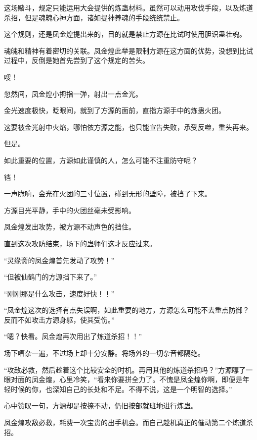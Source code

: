 
\begin{this_body}



这场赌斗，规定只能运用大会提供的炼蛊材料。虽然可以动用攻伐手段，以及炼道杀招，但是魂魄心神方面，诸如提神养魂的手段统统禁止。

这个规则，还是凤金煌提出来的，目的就是禁止方源在比试时使用胆识蛊壮魂。

魂魄和精神有着密切的关联。凤金煌此举是限制方源在这方面的优势，没想到比试过程中，反倒是她首先尝到了这个规定的苦头。

嗖！

忽然间，凤金煌小拇指一弹，射出一点金光。

金光速度极快，眨眼间，就到了方源的面前，直指方源手中的炼蛊火团。

这要被金光射中火焰，哪怕依方源之能，也只能宣告失败，承受反噬，重头再来。

但是。

如此重要的位置，方源如此谨慎的人，怎么可能不注重防守呢？

铛！

一声脆响，金光在火团的三寸位置，碰到无形的壁障，被挡了下来。

方源目光平静，手中的火团丝毫未受影响。

凤金煌发出攻势，被方源不动声色的挡住。

直到这次攻防结束，场下的蛊师们这才反应过来。

“灵缘斋的凤金煌首先发动了攻势！”

“但被仙鹤门的方源挡下来了。”

“刚刚那是什么攻击，速度好快！！”

“凤金煌这次的选择有点失误啊，如此重要的地方，方源怎么可能不去重点防御？反而不如攻击方源身躯，使其受伤。”

“嗯？快看。凤金煌再次用出了炼道杀招！！”

场下嘈杂一遍，不过场上却十分安静。将场外的一切杂音都隔绝。

“攻敌必救，然后趁着这个比较安全的时机。再用其他的炼道杀招吗？”方源瞟了一眼对面的凤金煌，心里冷笑，“看来你要拼全力了。不愧是凤金煌你啊，即便是年轻时候的你，也深知自己的长处和不足。不得不说，这是一个明智的选择。”

心中赞叹一句，方源却是按捺不动，仍旧按部就班地进行炼蛊。

凤金煌攻敌必救，耗费一次宝贵的出手机会。而自己趁机真正的催动第二个炼道杀招。


\end{this_body}
